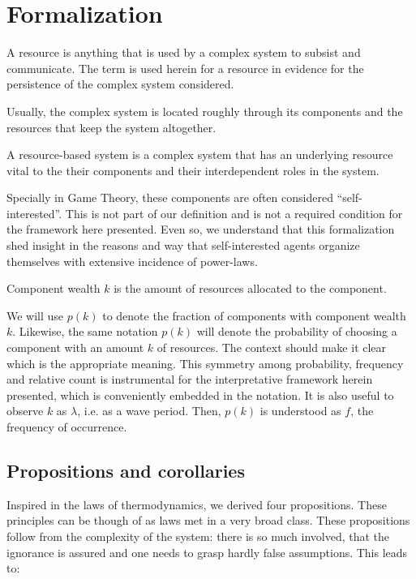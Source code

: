 \documentclass[a4paper, 11pt]{article} %
\newenvironment{definition}[1][Definition]{\begin{trivlist}
\item[\hskip \labelsep {\bfseries #1}]}{\end{trivlist}}
\begin{document}
\section{Formalization}\label{sec:form}

\begin{definition}
	A resource is anything that is used by a complex system to subsist and communicate. The term is used herein for a resource in evidence for the persistence of the complex system considered.
\end{definition}

 Usually, the complex system is located roughly through its components and the resources that keep the system altogether.

\begin{definition}
	A resource-based system is a complex system that has an underlying resource vital to the their components and their interdependent roles in the system.
\end{definition}

Specially in Game Theory, these components are often considered
``self-interested''. This is not part of our definition and
is not a required condition for the framework here presented.
Even so, we understand that this formalization shed insight
in the reasons and way that self-interested agents
organize themselves
with extensive incidence of power-laws.

\begin{definition}
	Component wealth $k$ is the amount of resources allocated to the component.
\end{definition}

We will use $p(k)$ to denote the fraction of components with component wealth $k$. Likewise, the same notation $p(k)$ will denote the probability of choosing a component with an amount $k$ of resources.
The context should make it clear which is the appropriate meaning.
This symmetry among probability, frequency and relative count is
instrumental for the interpretative framework herein presented,
which is conveniently embedded in the notation.
It is also useful to observe 
$k$ as $\lambda$, i.e. as a wave period.
Then, $p(k)$ is understood as  $f$, the
frequency of occurrence.

\subsection{Propositions and corollaries}

Inspired in the laws of thermodynamics, we derived four
propositions.
These principles can be though of as laws met in
a very broad class.
These propositions follow from the complexity of the system:
there is so much involved, that the ignorance is assured and
one needs to grasp hardly false assumptions. 
This leads to:
\end{document}
